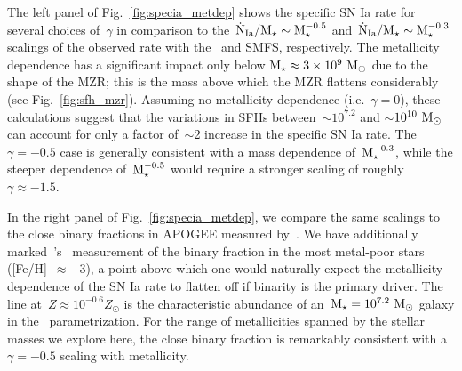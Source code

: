 \documentclass[foo.tex]{subfiles}
\begin{document}
The left panel of Fig.~\ref{fig:specia_metdep} shows the specific SN Ia rate
for several choices of~$\gamma$ in comparison to the~$\dot{\text{N}}_\text{Ia} /
\text{M}_\star \sim \text{M}_\star^{-0.5}$ and~$\dot{\text{N}}_\text{Ia} / \text{M}_\star \sim
\text{M}_\star^{-0.3}$ scalings of the observed rate with the~\citet{Bell2003} and
\citet{Baldry2012} SMFS, respectively.
The metallicity dependence has a significant impact only below
$\text{M}_\star \approx 3\times10^9~\text{M}_\odot$ due to the shape of the MZR;
this is the mass above which the MZR flattens considerably (see
Fig.~\ref{fig:sfh_mzr}).
Assuming no metallicity dependence (i.e.~$\gamma = 0$), these calculations
suggest that the variations in SFHs between~$\sim$$10^{7.2}$ and
$\sim$$10^{10}~\text{M}_\odot$ can account for only a factor of~$\sim$2 increase in the
specific SN Ia rate.
The~$\gamma = -0.5$ case is generally consistent with a mass dependence
of~$\text{M}_\star^{-0.3}$, while the steeper dependence of~$\text{M}_\star^{-0.5}$ would
require a stronger scaling of roughly~$\gamma \approx -1.5$.
\par
In the right panel of Fig.~\ref{fig:specia_metdep}, we compare the same
scalings to the close binary fractions in APOGEE measured by~\citet{Moe2019}.
{\color{red}
We have additionally marked~\citeauthor{Moe2019}'s~\citeyearpar{Moe2019}
measurement of the binary fraction in the most metal-poor stars
([Fe/H]~$\approx -3$), a point above which one would naturally expect the
metallicity dependence of the SN Ia rate to flatten off if binarity is the
primary driver.
}
The line at~$Z \approx 10^{-0.6} Z_\odot$ is the characteristic abundance of
an~$\text{M}_\star = 10^{7.2}~\text{M}_\odot$ galaxy in the~\citet{Zahid2014} parametrization.
For the range of metallicities spanned by the stellar masses we explore here,
the close binary fraction is remarkably consistent with a~$\gamma = -0.5$
scaling with metallicity.
\end{document}
